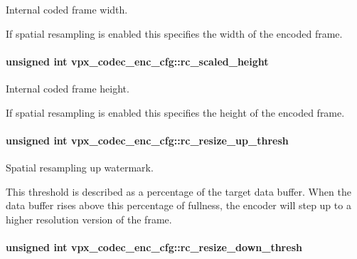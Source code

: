 Internal coded frame width. 

If spatial resampling is enabled this specifies the width of the encoded frame. 
\paragraph[{\texorpdfstring{rc\+\_\+scaled\+\_\+height}{rc_scaled_height}}]{\setlength{\rightskip}{0pt plus 5cm}unsigned int vpx\+\_\+codec\+\_\+enc\+\_\+cfg\+::rc\+\_\+scaled\+\_\+height}\hypertarget{structvpx__codec__enc__cfg_a5586418c28a5f7f327c4ba7567467243}{}\label{structvpx__codec__enc__cfg_a5586418c28a5f7f327c4ba7567467243}


Internal coded frame height. 

If spatial resampling is enabled this specifies the height of the encoded frame. 
\paragraph[{\texorpdfstring{rc\+\_\+resize\+\_\+up\+\_\+thresh}{rc_resize_up_thresh}}]{\setlength{\rightskip}{0pt plus 5cm}unsigned int vpx\+\_\+codec\+\_\+enc\+\_\+cfg\+::rc\+\_\+resize\+\_\+up\+\_\+thresh}\hypertarget{structvpx__codec__enc__cfg_a855599c0660f31dfcab4a64996b4f6ad}{}\label{structvpx__codec__enc__cfg_a855599c0660f31dfcab4a64996b4f6ad}


Spatial resampling up watermark. 

This threshold is described as a percentage of the target data buffer. When the data buffer rises above this percentage of fullness, the encoder will step up to a higher resolution version of the frame. 
\paragraph[{\texorpdfstring{rc\+\_\+resize\+\_\+down\+\_\+thresh}{rc_resize_down_thresh}}]{\setlength{\rightskip}{0pt plus 5cm}unsigned int vpx\+\_\+codec\+\_\+enc\+\_\+cfg\+::rc\+\_\+resize\+\_\+down\+\_\+thresh}\hypertarget{structvpx__codec__enc__cfg_a1be7bd7b0eaf1e99b5e4028c37c65488}{}\label{structvpx__codec__enc__cfg_a1be7bd7b0eaf1e99b5e4028c37c65488}


